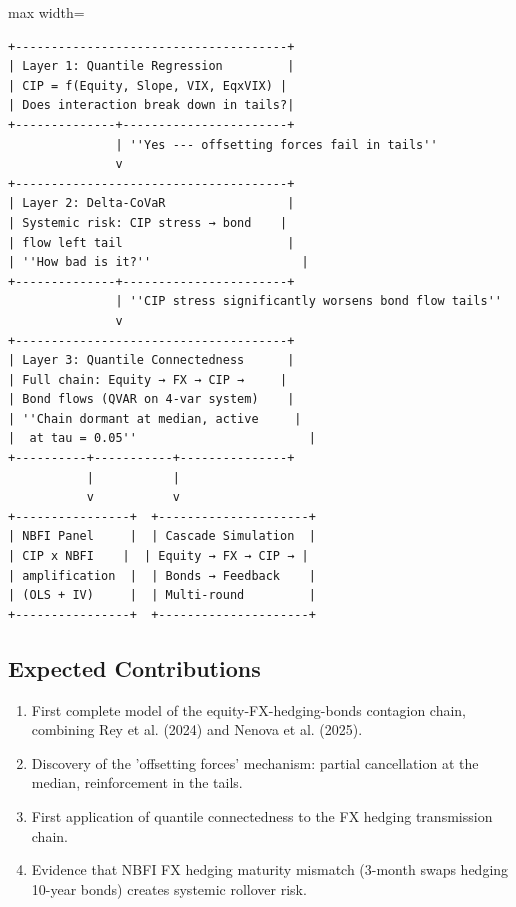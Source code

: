 \documentclass[11pt,a4paper]{article}
\begin{document}
\begin{adjustbox}{max width=\textwidth}
\begin{minipage}{1.5\textwidth}
\begin{verbatim}
+--------------------------------------+
| Layer 1: Quantile Regression         |
| CIP = f(Equity, Slope, VIX, EqxVIX) |
| Does interaction break down in tails?|
+--------------+-----------------------+
               | ''Yes --- offsetting forces fail in tails''
               v
+--------------------------------------+
| Layer 2: Delta-CoVaR                 |
| Systemic risk: CIP stress → bond    |
| flow left tail                       |
| ''How bad is it?''                     |
+--------------+-----------------------+
               | ''CIP stress significantly worsens bond flow tails''
               v
+--------------------------------------+
| Layer 3: Quantile Connectedness      |
| Full chain: Equity → FX → CIP →     |
| Bond flows (QVAR on 4-var system)    |
| ''Chain dormant at median, active     |
|  at tau = 0.05''                        |
+----------+-----------+---------------+
           |           |
           v           v
+----------------+  +---------------------+
| NBFI Panel     |  | Cascade Simulation  |
| CIP x NBFI    |  | Equity → FX → CIP → |
| amplification  |  | Bonds → Feedback    |
| (OLS + IV)     |  | Multi-round         |
+----------------+  +---------------------+
\end{verbatim}
\end{minipage}
\end{adjustbox}


\subsection{Expected Contributions}

\begin{enumerate}
\item First complete model of the equity-FX-hedging-bonds contagion chain, combining Rey et al. (2024) and Nenova et al. (2025).
\item Discovery of the 'offsetting forces' mechanism: partial cancellation at the median, reinforcement in the tails.
\item First application of quantile connectedness to the FX hedging transmission chain.
\item Evidence that NBFI FX hedging maturity mismatch (3-month swaps hedging 10-year bonds) creates systemic rollover risk.

\end{enumerate}
\end{document}
